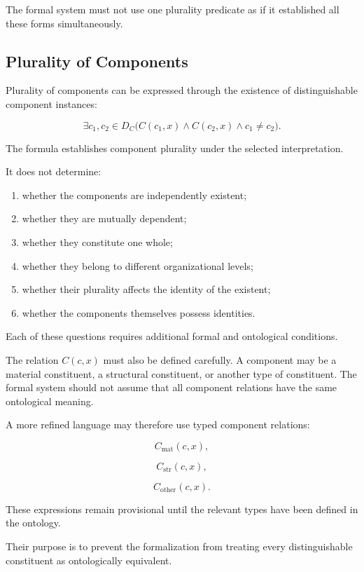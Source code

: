 The formal system must not use one
plurality predicate as if it established
all these forms simultaneously.

\subsection{Plurality of Components}

Plurality of components can be expressed
through the existence of distinguishable
component instances:

\[
    \exists c_1,c_2 \in D_C
    \bigl(
        C(c_1,x)
        \land
        C(c_2,x)
        \land
        c_1 \neq c_2
    \bigr).
\]

The formula establishes component plurality
under the selected interpretation.

It does not determine:

\begin{enumerate}
    \item whether the components are
    independently existent;
    \item whether they are mutually
    dependent;
    \item whether they constitute one
    whole;
    \item whether they belong to different
    organizational levels;
    \item whether their plurality affects
    the identity of the existent;
    \item whether the components themselves
    possess identities.
\end{enumerate}

Each of these questions requires
additional formal and ontological
conditions.

The relation \(C(c,x)\) must also be
defined carefully. A component may be
a material constituent, a structural
constituent, or another type of
constituent. The formal system should
not assume that all component relations
have the same ontological meaning.

A more refined language may therefore
use typed component relations:

\[
    C_{\mathrm{mat}}(c,x),
\]

\[
    C_{\mathrm{str}}(c,x),
\]

\[
    C_{\mathrm{other}}(c,x).
\]

These expressions remain provisional
until the relevant types have been
defined in the ontology.

Their purpose is to prevent the
formalization from treating every
distinguishable constituent as
ontologically equivalent.

